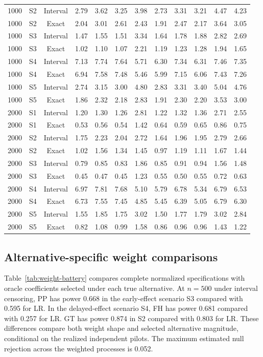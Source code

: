 \documentclass[12pt]{article}
\theoremstyle{definition}
\theoremstyle{remark}
\begin{document}
\begin{longtable}{rccrrrrrrrrr}
1000 & S2 & Interval & 2.79 & 3.62 & 3.25 & 3.98 & 2.73 & 3.31 & 3.21 & 4.47 & 4.23 \\
1000 & S2 & Exact & 2.04 & 3.01 & 2.61 & 2.43 & 1.91 & 2.47 & 2.17 & 3.64 & 3.05 \\
1000 & S3 & Interval & 1.47 & 1.55 & 1.51 & 3.34 & 1.64 & 1.78 & 1.88 & 2.82 & 2.69 \\
1000 & S3 & Exact & 1.02 & 1.10 & 1.07 & 2.21 & 1.19 & 1.23 & 1.28 & 1.94 & 1.65 \\
1000 & S4 & Interval & 7.13 & 7.74 & 7.64 & 5.71 & 6.30 & 7.34 & 6.31 & 7.46 & 7.35 \\
1000 & S4 & Exact & 6.94 & 7.58 & 7.48 & 5.46 & 5.99 & 7.15 & 6.06 & 7.43 & 7.26 \\
1000 & S5 & Interval & 2.74 & 3.15 & 3.00 & 4.80 & 2.83 & 3.31 & 3.40 & 5.04 & 4.76 \\
1000 & S5 & Exact & 1.86 & 2.32 & 2.18 & 2.83 & 1.91 & 2.30 & 2.20 & 3.53 & 3.00 \\
2000 & S1 & Interval & 1.20 & 1.30 & 1.26 & 2.81 & 1.22 & 1.32 & 1.36 & 2.71 & 2.55 \\
2000 & S1 & Exact & 0.53 & 0.56 & 0.54 & 1.42 & 0.64 & 0.59 & 0.65 & 0.86 & 0.75 \\
2000 & S2 & Interval & 1.75 & 2.23 & 2.04 & 2.72 & 1.64 & 1.96 & 1.95 & 2.79 & 2.66 \\
2000 & S2 & Exact & 1.02 & 1.56 & 1.34 & 1.45 & 0.97 & 1.19 & 1.11 & 1.67 & 1.44 \\
2000 & S3 & Interval & 0.79 & 0.85 & 0.83 & 1.86 & 0.85 & 0.91 & 0.94 & 1.56 & 1.48 \\
2000 & S3 & Exact & 0.45 & 0.47 & 0.45 & 1.23 & 0.55 & 0.50 & 0.55 & 0.72 & 0.63 \\
2000 & S4 & Interval & 6.97 & 7.81 & 7.68 & 5.10 & 5.79 & 6.78 & 5.34 & 6.79 & 6.53 \\
2000 & S4 & Exact & 6.73 & 7.55 & 7.45 & 4.85 & 5.45 & 6.39 & 5.05 & 6.79 & 6.30 \\
2000 & S5 & Interval & 1.55 & 1.85 & 1.75 & 3.02 & 1.50 & 1.77 & 1.79 & 3.02 & 2.84 \\
2000 & S5 & Exact & 0.82 & 1.08 & 0.99 & 1.58 & 0.86 & 0.96 & 0.96 & 1.43 & 1.22 \\
\end{longtable}
\endgroup

\subsection{Alternative-specific weight comparisons}
\label{sec:app-alternative-weights}
Table~\ref{tab:weight-battery} compares complete normalized specifications with oracle coefficients selected under each true alternative. At $n=500$ under interval censoring, PP has power 0.668 in the early-effect scenario S3 compared with 0.595 for LR. In the delayed-effect scenario S4, FH has power 0.681 compared with 0.257 for LR. GT has power 0.874 in S2 compared with 0.803 for LR. These differences compare both weight shape and selected alternative magnitude, conditional on the realized independent pilots. The maximum estimated null rejection across the weighted processes is 0.052.
\end{document}
